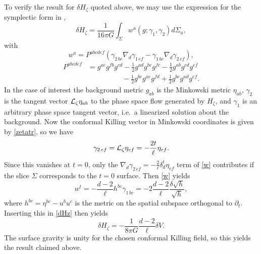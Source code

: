 \documentclass[aps,prd,twocolumn,showpacs,groupedaddress,nofootinbib,longbibliography]{revtex4-1}
\def\beq{\begin{equation}}
\def\eeq{\end{equation}}
\def\g{\gamma}\def\G{\Gamma}
\def\d{\delta}\def\D{\Delta}
\def\z{\zeta}
\def\half{{\textstyle{\frac{1}{2}}}}
\def\cL{{\cal L}}
\begin{document}
To verify the result for $\d H_\z$ quoted above, 
we may use the expression for the symplectic form in \cite{Hollands:2012sf},
%
\beq\label{dHz}
\d H_\z = \frac{1}{16\pi G}\int_\Sigma w^a(g; \g_1,\g_2) d\Sigma_a,
\eeq
%
with
%
\beq
w^a = P^{abcdef}(\g_{2\,bc}\nabla_d\g_{1\,ef} - \g_{1\,bc}\nabla_d\g_{2\,ef}),\label{w}
\eeq
%
%
\begin{align}
P^{abcdef} &= g^{ae}g^{fb}g^{cd}-\half g^{ad}g^{be}g^{fc} -\half g^{ab}g^{cd}g^{ef}\nonumber\\
&~~~~~~~~~~~~~~~~~~~~~~-\half g^{bc}g^{ae}g^{fd}+\half g^{bc}g^{ad}g^{ef}.
\end{align}
%
In the case of interest the background metric $g_{ab}$ is the Minkowski metric $\eta_{ab}$,
$\gamma_2$ is the tangent vector $\cL_\z \eta_{ab}$ to the phase space flow generated by 
$H_\z$, and $\gamma_1$ is an arbitrary phase space tangent vector, i.e.\ a linearized solution about the background.
Now the conformal Killing vector in Minkowski coordinates is given by \eqref{zetatr}, so we have
%
\beq
\g_{2\,ef}=\cL_\z \eta_{ef} = -\frac{2t}{\ell} \eta_{ef}.
\eeq
%
Since this vanishes at $t=0$, only the $\nabla_d\g_{2\,ef}=-\frac{2}{\ell}\delta_d^t\eta_{ef}$ 
term of \eqref{w} contributes if the slice $\Sigma$ corresponds to the $t=0$ surface.
Then \eqref{w} yields
%
\beq
w^t = -\frac{d-2}{\ell}h^{bc}\g_{1\,bc} = -2\frac{d-2}{\ell}\frac{\d \sqrt{h}}{\sqrt{h}},
\eeq
%
where $h^{bc}=\eta^{bc}-u^b u^c$ is the metric on the spatial subspace orthogonal to $\partial_t$. 
Inserting this in \eqref{dHz} then yields
%
\beq\label{dHz2}
\d H_\z = -\frac{1}{8\pi G}\frac{d-2}{\ell}\d V.
\eeq
%
The surface gravity is unity for the chosen conformal Killing field, so this yields the result
claimed above. 


\end{document}

